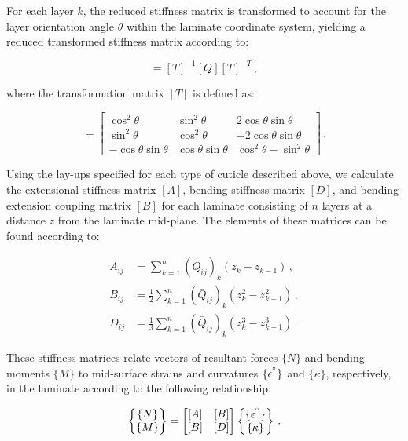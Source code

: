 \documentclass[twocolumn, linenumbers, superscriptaddress, nofootinbib]{revtex4-1}
\begin{document}
				For each layer $k$, the reduced stiffness matrix is transformed to account for the layer orientation angle $\theta$ within the laminate coordinate system, yielding a reduced transformed stiffness matrix according to:
				
				\begin{equation}
					[\bar{Q}] = [T]^{-1}[Q][T]^{-T}\,,
				\end{equation}
				
				where the transformation matrix $[T]$ is defined as:
				
				\begin{equation}
				[T] =
				 \begin{bmatrix}
					 \cos^2\theta & \sin^2\theta & 2\cos\theta\sin\theta \\
					 \sin^2\theta & \cos^2\theta & -2\cos\theta\sin\theta \\
					 -\cos\theta\sin\theta & \cos\theta\sin\theta & \cos^2\theta - \sin^2\theta
				 \end{bmatrix}\,.
				\end{equation}
				
				Using the lay-ups specified for each type of cuticle described above, we calculate the extensional stiffness matrix $[A]$, bending stiffness matrix $[D]$, and bending-extension coupling matrix $[B]$ for each laminate consisting of $n$ layers at a distance $z$ from the laminate mid-plane.
				The elements of these matrices can be found according to:
				
				\begin{equation}
					\begin{aligned}
						A_{ij} & = \sum_{k = 1}^{n}(\bar{Q}_{ij})_k(z_{k} - z_{k-1})\,, \\
						B_{ij} & = \frac{1}{2}\sum_{k = 1}^{n}(\bar{Q}_{ij})_k(z^2_{k} - z^2_{k-1})\,, \\
						D_{ij} & = \frac{1}{3}\sum_{k = 1}^{n}(\bar{Q}_{ij})_k(z^3_{k} - z^3_{k-1})\,.
					\end{aligned}
				\end{equation}
				
				These stiffness matrices relate vectors of resultant forces $\{N\}$ and bending moments $\{M\}$ to mid-surface strains and curvatures $\{\epsilon^{\degree}\}$ and $\{\kappa\}$, respectively, in the laminate according to the following relationship:
				
				\begin{equation}
					\begin{Bmatrix}
						\{N\} \\
						\{M\}
					\end{Bmatrix}
					=
					\begin{bmatrix}
						[A] & [B] \\
						[B] & [D]
					\end{bmatrix}
					\begin{Bmatrix}
					\{\epsilon^{\degree}\} \\
					\{\kappa\}
					\end{Bmatrix}\,.
				\end{equation}
				
\end{document}
